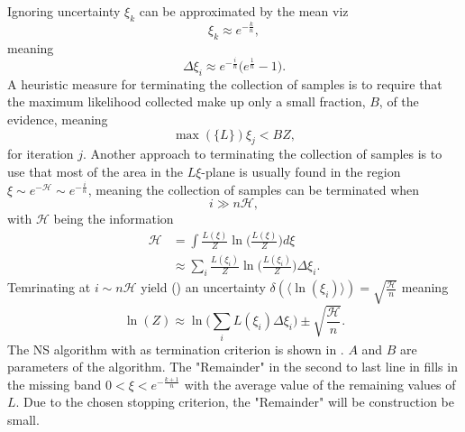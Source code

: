 Ignoring uncertainty $\xi_k$ can be approximated by the mean viz
\begin{equation}
	\xi_k\approx e^{-\frac{k}{n}},
\end{equation}
meaning
\begin{equation}
	\Delta \xi_i\approx e^{-\frac{i}{n}}\big(e^{\frac{1}{n}}-1\big).
\end{equation}
A heuristic measure for terminating the collection of samples is to require that the maximum likelihood collected make up only a small fraction, $B$, of the evidence, meaning
\begin{equation}
	\max(\{L\})\xi_j < BZ,
\end{equation}
for iteration $j$. Another approach to terminating the collection of samples is to use that most of the area in the $L\xi$-plane is usually found in the region~\citep{skilling2004,skilling2006} $\xi \sim e^{-\mathcal{H}}\sim e^{-\frac{i}{n}}$, meaning the collection of samples can be terminated when
\begin{equation}
	i\gg n\mathcal{H},
	\label{eq:stop2}
\end{equation}
with $\mathcal{H}$ being the information~\citep{skilling2004}
\begin{equation}
	\begin{split}
		\mathcal{H} &= \int \frac{L(\xi)}{Z}\ln\bigg(\frac{L(\xi)}{Z}\bigg)d\xi\\
		& \approx \sum_i\frac{L(\xi_i)}{Z}\ln\bigg(\frac{L(\xi_i)}{Z}\bigg)\Delta \xi_i.
	\end{split}
\end{equation}
Temrinating at $i\sim n\mathcal{H}$ yield () an uncertainty $\delta (\langle\ln(\xi_i)\rangle)=\sqrt{\frac{\mathcal{H}}{n}}$ meaning
\begin{equation}
	\ln(Z)\approx \ln\bigg(\sum_{i}L(\xi_i)\Delta \xi_i\bigg)\pm \sqrt{\frac{\mathcal{H}}{n}}.
\end{equation}
The NS algorithm with  as termination criterion is shown in . $A$ and $B$ are parameters of the algorithm. The "Remainder" in the second to last line in  fills in the missing band $0<\xi<e^{-\frac{k+1}{n}}$ with the average value of the remaining values of $L$. Due to the chosen stopping criterion, the "Remainder" will be construction be small.

